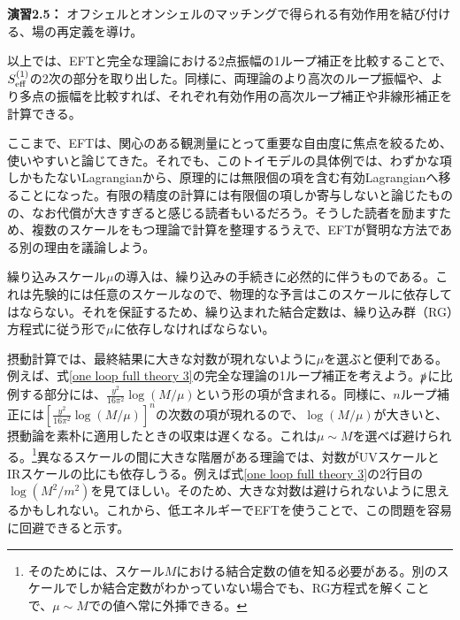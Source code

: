 %
\begin{eBox}
%
{\bf 演習2.5：} オフシェルとオンシェルのマッチングで得られる有効作用を結び付ける、場の再定義を導け。
%
\end{eBox}
%
 
以上では、EFTと完全な理論における2点振幅の1ループ補正を比較することで、$S^{(1)}_{\rm eff}$の2次の部分を取り出した。同様に、両理論のより高次のループ振幅や、より多点の振幅を比較すれば、それぞれ有効作用の高次ループ補正や非線形補正を計算できる。
 






ここまで、EFTは、関心のある観測量にとって重要な自由度に焦点を絞るため、使いやすいと論じてきた。それでも、このトイモデルの具体例では、わずかな項しかもたないLagrangianから、原理的には無限個の項を含む有効Lagrangianへ移ることになった。有限の精度の計算には有限個の項しか寄与しないと論じたものの、なお代償が大きすぎると感じる読者もいるだろう。そうした読者を励ますため、複数のスケールをもつ理論で計算を整理するうえで、EFTが賢明な方法である別の理由を議論しよう。

繰り込みスケール$\mu$の導入は、繰り込みの手続きに必然的に伴うものである。これは先験的には任意のスケールなので、物理的な予言はこのスケールに依存してはならない。それを保証するため、繰り込まれた結合定数は、繰り込み群（RG）方程式に従う形で$\mu$に依存しなければならない。

摂動計算では、最終結果に大きな対数が現れないように$\mu$を選ぶと便利である。例えば、式\eqref{one loop full theory 3}の完全な理論の1ループ補正を考えよう。$\slashed{p}$に比例する部分には、$\frac{y^2}{16 \pi^2} \log (M/\mu)$という形の項が含まれる。同様に、$n$ループ補正には$\left[ \frac{y^2}{16 \pi^2} \log (M/\mu) \right]^n$の次数の項が現れるので、$\log (M /\mu)$が大きいと、摂動論を素朴に適用したときの収束は遅くなる。これは$\mu \sim M$を選べば避けられる。\footnote{そのためには、スケール$M$における結合定数の値を知る必要がある。別のスケールでしか結合定数がわかっていない場合でも、RG方程式を解くことで、$\mu \sim M$での値へ常に外挿できる。}異なるスケールの間に大きな階層がある理論では、対数がUVスケールとIRスケールの比にも依存しうる。例えば式\eqref{one loop full theory 3}の2行目の$\log (M^2 /m^2)$を見てほしい。そのため、大きな対数は避けられないように思えるかもしれない。これから、低エネルギーでEFTを使うことで、この問題を容易に回避できると示す。

